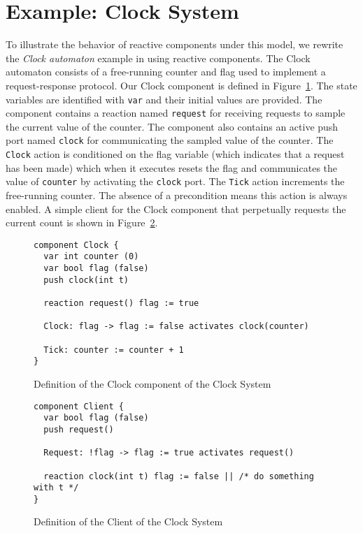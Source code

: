 \section{Example:  Clock System}
To illustrate the behavior of reactive components under this model, we rewrite the \emph{Clock automaton} example in \cite{nancy1996distributed} using reactive components.
The Clock automaton consists of a free-running counter and flag used to implement a request-response protocol.
Our Clock component is defined in Figure~\ref{clock_component}.
The state variables are identified with \verb+var+ and their initial values are provided.
The component contains a reaction named \verb+request+ for receiving requests to sample the current value of the counter.
The component also contains an active push port named \verb+clock+ for communicating the sampled value of the counter.
The \verb+Clock+ action is conditioned on the flag variable (which indicates that a request has been made) which when it executes resets the flag and communicates the value of \verb+counter+ by activating the \verb+clock+ port.
The \verb+Tick+ action increments the free-running counter.
The absence of a precondition means this action is always enabled.
A simple client for the Clock component that perpetually requests the current count is shown in Figure~\ref{client_component}.

\begin{figure}
\begin{verbatim}
component Clock {
  var int counter (0)
  var bool flag (false)
  push clock(int t)

  reaction request() flag := true

  Clock: flag -> flag := false activates clock(counter)

  Tick: counter := counter + 1
}
\end{verbatim}
\caption{Definition of the Clock component of the Clock System}
\label{clock_component}
\end{figure}

\begin{figure}
\begin{verbatim}
component Client {
  var bool flag (false)
  push request()

  Request: !flag -> flag := true activates request()

  reaction clock(int t) flag := false || /* do something with t */
}
\end{verbatim}
\caption{Definition of the Client of the Clock System}
\label{client_component}
\end{figure}

